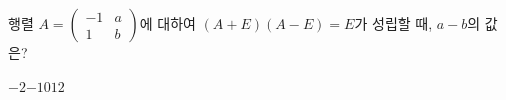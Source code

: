 \hspace*{2mm}\begin{minipage}[t]{\dimexpr\linewidth-2mm\relax}\vspace{0pt}
행렬 $A=\begin{pmatrix} -1 & a \\ 1 & b \end{pmatrix}$에 대하여 $(A+E)(A-E)=E$가 성립할 때, $a-b$의 값은? 
\begin{choices32}{$-2$}{$-1$}{$0$}{$1$}{$2$}\end{choices32}\end{minipage}
